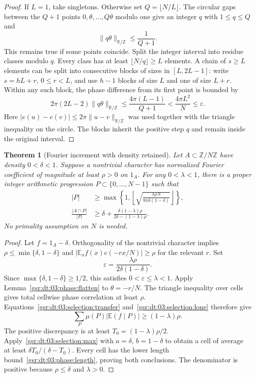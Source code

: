 \documentclass[11pt,letterpaper]{article}
\numberwithin{equation}{section}
\newtheorem{theorem}{Theorem}[section]
\theoremstyle{definition}
\theoremstyle{remark}
\newcommand{\E}{\mathbb E}
\newcommand{\R}{\mathbb R}
\newcommand{\Z}{\mathbb Z}
\newcommand{\1}{\mathbf 1}
\begin{document}
\begin{proof}
If $L=1$, take singletons. Otherwise set $Q=\lfloor N/L\rfloor$.
The circular gaps between the $Q+1$ points
$0,\theta,\ldots,Q\theta$ modulo one give an integer $q$ with
$1\le q\le Q$ and
\[
 \|q\theta\|_{\R/\Z}\le\frac1{Q+1}.
\]
This remains true if some points coincide. Split the integer interval
into residue classes modulo $q$. Every class has at least
$\lfloor N/q\rfloor\ge L$ elements. A chain of $s\ge L$ elements can
be split into consecutive blocks of sizes in $[L,2L-1]$: write
$s=hL+r$, $0\le r<L$, and use $h-1$ blocks of size $L$ and one of
size $L+r$. Within any such block, the phase difference from its first
point is bounded by
\[
 2\pi(2L-2)\|q\theta\|_{\R/\Z}
 \le \frac{4\pi(L-1)}{Q+1}
 < \frac{4\pi L^2}{N}\le\varepsilon.
\]
Here $|e(u)-e(v)|\le2\pi\|u-v\|_{\R/\Z}$ was used together with
the triangle inequality on the circle. The blocks inherit the positive
step $q$ and remain inside the original interval.
\end{proof}

\begin{theorem}[Fourier increment with density retained]
\label{gsr:dt:03:phase:increment}
Let $A\subset\Z/N\Z$ have density $0<\delta<1$. Suppose a nontrivial
character has normalized Fourier coefficient of magnitude at least
$\rho>0$ on $1_A$. For any $0<\lambda<1$, there is a proper integer
arithmetic progression $P\subset\{0,\ldots,N-1\}$ such that
\begin{align}
 |P|&\ge\max\left\{1,
 \left\lfloor\sqrt{\frac{\lambda\rho N}
                         {8\pi\delta(1-\delta)}}\right\rfloor\right\},
 \label{gsr:dt:03:phase:length}\\
 \frac{|A\cap P|}{|P|}
 &\ge\delta+
 \frac{\delta(1-\lambda)\rho}{2\delta-(1-\lambda)\rho}.
 \label{gsr:dt:03:phase:density}
\end{align}
No primality assumption on $N$ is needed.
\end{theorem}

\begin{proof}
Let $f=1_A-\delta$. Orthogonality of the nontrivial character implies
$\rho\le\min\{\delta,1-\delta\}$ and
$|\E_x f(x)e(-rx/N)|\ge\rho$ for the relevant $r$.
Set
\[
 \varepsilon=\frac{\lambda\rho}{2\delta(1-\delta)}.
\]
Since $\max\{\delta,1-\delta\}\ge1/2$, this satisfies
$0<\varepsilon\le\lambda<1$. Apply Lemma~\ref{gsr:dt:03:phase:flatten} to
$\theta=-r/N$. The triangle inequality over cells gives total cellwise
phase correlation at least $\rho$. Equations~\eqref{gsr:dt:03:selection:transfer}
and~\eqref{gsr:dt:03:selection:lone} therefore give
\[
 \sum_P\mu(P)|\E(f\mid P)|\ge(1-\lambda)\rho.
\]
The positive discrepancy is at least $T_0=(1-\lambda)\rho/2$.
Apply~\eqref{gsr:dt:03:selection:max} with $a=\delta$, $b=1-\delta$ to obtain
a cell of average at least $\delta T_0/(\delta-T_0)$.
Every cell has the lower length bound~\eqref{gsr:dt:03:phase:length}, proving
both conclusions. The denominator is positive because $\rho\le\delta$
and $\lambda>0$.
\end{proof}
\end{document}
